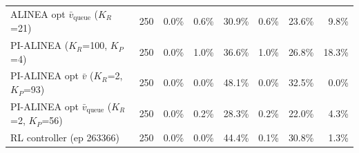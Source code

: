 \begin{longtable}{p{5.2cm}rrrrrrr}
ALINEA opt $\bar{v}_{\mathrm{queue}}$ ($K_R$=21) & 250 & 0.0\% & 0.6\% & 30.9\% & 0.6\% & 23.6\% & 9.8\% \\
PI-ALINEA ($K_R$=100, $K_P$=4) & 250 & 0.0\% & 1.0\% & 36.6\% & 1.0\% & 26.8\% & 18.3\% \\
PI-ALINEA opt $\bar{v}$ ($K_R$=2, $K_P$=93) & 250 & 0.0\% & 0.0\% & 48.1\% & 0.0\% & 32.5\% & 0.0\% \\
PI-ALINEA opt $\bar{v}_{\mathrm{queue}}$ ($K_R$=2, $K_P$=56) & 250 & 0.0\% & 0.2\% & 28.3\% & 0.2\% & 22.0\% & 4.3\% \\
RL controller (ep 263366) & 250 & 0.0\% & 0.0\% & 44.4\% & 0.1\% & 30.8\% & 1.3\% \\
\end{longtable}
\endgroup